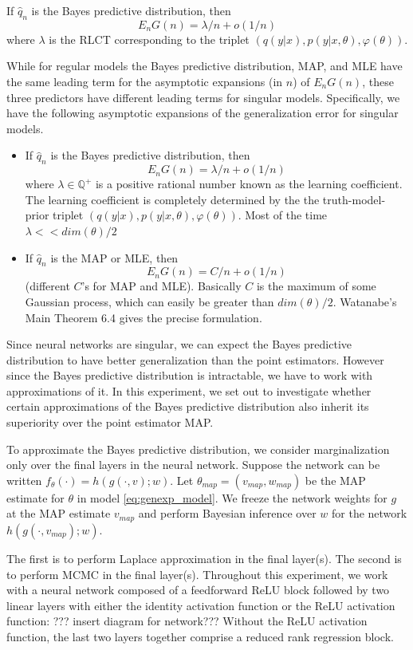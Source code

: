 \documentclass{article} %
\begin{document}
If $\hat q_n$ is the Bayes predictive distribution, then 
$$
E_n G(n) = \lambda/n + o(1/n)
$$ 
where $\lambda$ is the RLCT corresponding to the triplet $( q(y|x), p(y|x,\theta), \varphi(\theta) )$.

While for regular models the Bayes predictive distribution, MAP, and MLE have the same leading term for the asymptotic expansions (in $n$) of $E_n G(n)$, these three predictors have different leading terms for singular models.  Specifically, we have the following asymptotic expansions of the generalization error for singular models.
\begin{itemize}
\item If $\hat q_n$ is the Bayes predictive distribution, then 
$$
E_n G(n) = \lambda/n + o(1/n)
$$ 
where $\lambda \in \mathbb Q^+$ is a positive rational number known as the learning coefficient. The learning coefficient is completely determined by the the truth-model-prior triplet $( q(y|x), p(y|x,\theta), \varphi(\theta) )$. Most of the time $\lambda << dim(\theta)/2$
\item If $\hat q_n$ is the MAP or MLE, then 
$$
E_n G(n) = C/n + o(1/n)
$$
(different $C$'s for MAP and MLE). Basically $C$ is the maximum of some Gaussian process, which can easily be greater than $dim(\theta)/2$. Watanabe's Main Theorem 6.4 gives the precise formulation. 
\end{itemize}


Since neural networks are singular, we can expect the Bayes predictive distribution to have better generalization than the point estimators. However since the Bayes predictive distribution is intractable, we have to work with approximations of it. In this experiment, we set out to investigate whether certain approximations of the Bayes predictive distribution also inherit its superiority over the point estimator MAP. 

To approximate the Bayes predictive distribution, we consider marginalization only over the final layers in the neural network. Suppose the network can be written $f_\theta(\cdot) = h(g(\cdot,v);w)$. Let $\theta_{map} = (v_{map}, w_{map})$ be the MAP estimate for $\theta$ in model \ref{eq:genexp_model}. We freeze the network weights for $g$ at the MAP estimate $v_{map}$ and perform Bayesian inference over $w$ for the network $h(g(\cdot,v_{map});w)$. 




The first is to perform Laplace approximation in the final layer(s). The second is to perform MCMC in the final layer(s). Throughout this experiment, we work with a neural network composed of a feedforward ReLU block followed by two linear layers with either the identity activation function or the ReLU activation function:
??? insert diagram for network???
Without the ReLU activation function, the last two layers together comprise a reduced rank regression block. 
\end{document}
